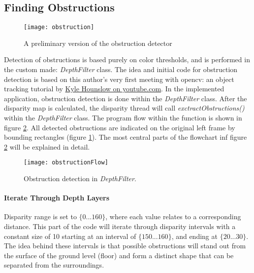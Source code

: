 \subsection{Finding Obstructions}

\begin{figure}
	\texttt{[image: obstruction]}
	\caption{A preliminary version of the obstruction detector}
	\label{fig:obstruction}
\end{figure}

Detection of obstructions is based purely on color thresholds, and is performed in the custom made: \textit{DepthFilter} class. The idea and initial code for obstruction detection is based on this author's very first meeting with \gls{opencv}: an object tracking tutorial by \href{https://www.youtube.com/watch?v=bSeFrPrqZ2A}{Kyle Hounslow on youtube.com}. In the implemented application, obstruction detection is done within the \textit{DepthFilter} class. After the disparity map is calculated, the disparity thread will call \textit{exctractObstructions()} within the \textit{DepthFilter} class. The program flow within the function is shown in figure \ref{fig:obstructionFlow}. All detected obstructions are indicated on the original left frame by bounding rectangles (figure \ref{fig:obstruction}). The most central parts of the flowchart inf figure \ref{fig:obstructionFlow} will be explained in detail.

\begin{figure}
	\centering
	\texttt{[image: obstructionFlow]}
	\caption{Obstruction detection in \textit{DepthFilter}.}
	\label{fig:obstructionFlow}
\end{figure}

\paragraph{Iterate Through Depth Layers}

Disparity range is set to $\{0 ... 160 \}$, where each value relates to a corresponding distance. This part of the code will iterate through disparity intervals with a constant size of 10 starting at an interval of $\{150 ... 160\}$, and ending at $\{20 ... 30 \}$. The idea behind these intervals is that possible obstructions will stand out from the surface of the ground level (floor) and form a distinct shape that can be separated from the surroundings.

